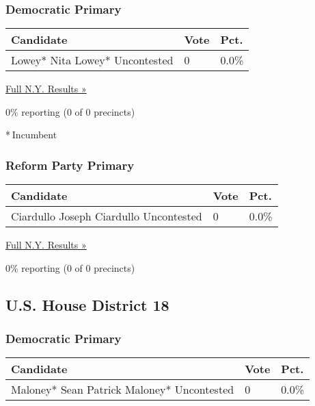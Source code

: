 \hypertarget{democratic-primary-17}{%
\subsubsection{Democratic Primary}\label{democratic-primary-17}}

\begin{longtable}[]{@{}lll@{}}
\toprule
Candidate & Vote & Pct.\tabularnewline
\midrule
\endhead
 Lowey* Nita Lowey* Uncontested & 0 & 0.0\%\tabularnewline
\bottomrule
\end{longtable}

\href{https://www.nytimes3xbfgragh.onion/elections/results/new-york}{Full
N.Y. Results »}

0\% reporting (0 of 0 precincts)

* Incumbent

\hypertarget{reform-party-primary-2}{%
\subsubsection{Reform Party Primary}\label{reform-party-primary-2}}

\begin{longtable}[]{@{}lll@{}}
\toprule
Candidate & Vote & Pct.\tabularnewline
\midrule
\endhead
 Ciardullo Joseph Ciardullo Uncontested & 0 & 0.0\%\tabularnewline
\bottomrule
\end{longtable}

\href{https://www.nytimes3xbfgragh.onion/elections/results/new-york}{Full
N.Y. Results »}

0\% reporting (0 of 0 precincts)

\hypertarget{us-house-district-18}{%
\subsection{U.S. House District 18}\label{us-house-district-18}}

\hypertarget{democratic-primary-18}{%
\subsubsection{Democratic Primary}\label{democratic-primary-18}}

\begin{longtable}[]{@{}lll@{}}
\toprule
Candidate & Vote & Pct.\tabularnewline
\midrule
\endhead
 Maloney* Sean Patrick Maloney* Uncontested & 0 & 0.0\%\tabularnewline
\bottomrule
\end{longtable}

